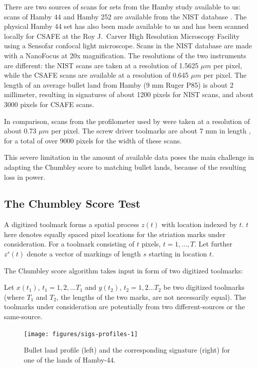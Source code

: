 \documentclass[12pt]{article}
\begin{document}
There are two sources of scans for sets from the Hamby study available
to us: scans of Hamby 44 and Hamby 252 are available from the NIST
database \citep{nist}. The physical Hamby 44 set has also been made
available to us and has been scanned locally for CSAFE at the Roy
J.~Carver High Resolution Microscopy Facility using a Sensofar confocal
light microscope. Scans in the NIST database are made with a NanoFocus
at 20x magnification. The resolutions of the two instruments are
different: the NIST scans are taken at a resolution of 1.5625 \(\mu m\)
per pixel, while the CSAFE scans are available at a resolution of 0.645
\(\mu m\) per pixel. The length of an average bullet land from Hamby (9
mm Ruger P85) is about 2 millimeter, resulting in signatures of about
1200 pixels for NIST scans, and about 3000 pixels for CSAFE scans.

In comparison, scans from the profilometer used by
\citet{chumbley, hadler} were taken at a resolution of about 0.73
\(\mu m\) per pixel. The screw driver toolmarks are about 7 mm in length
\citep{manytoolmarks1}, for a total of over 9000 pixels for the width of
these scans.

This severe limitation in the amount of available data poses the main
challenge in adapting the Chumbley score to matching bullet lands,
because of the resulting loss in power.

\hypertarget{the-chumbley-score-test}{%
\subsection{The Chumbley Score Test}\label{the-chumbley-score-test}}

A digitized toolmark forms a spatial process \(z(t)\) with location
indexed by \(t\). \(t\) here denotes equally spaced pixel locations for
the striation marks under consideration. For a toolmark consisting of
\(t\) pixels, \(t = 1, ..., T\). Let further \(z^s(t)\) denote a vector
of markings of length \(s\) starting in location \(t\).

The Chumbley score algorithm takes input in form of two digitized
toolmarks:

Let \(x(t_1)\), \(t_1 = 1,2,...T_1\) and \(y(t_2)\), \(t_2 = 1,2...T_2\)
be two digitized toolmarks (where \(T_1\) and \(T_2\), the lengths of
the two marks, are not necessarily equal). The toolmarks under
consideration are potentially from two different-sources or the
same-source.

\begin{figure}

{\centering \texttt{[image: figures/sigs-profiles-1]} 

}

\caption{Bullet land profile (left) and the corresponding signature (right) for one of the lands of Hamby-44.}\label{fig:sigs-profiles}
\end{figure}
\end{document}
